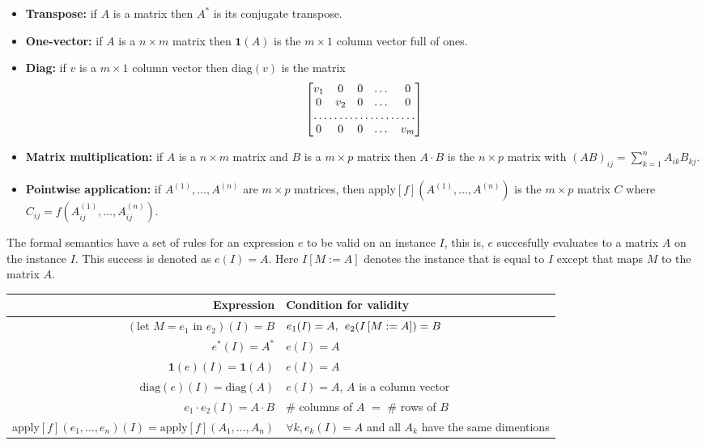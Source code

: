\begin{itemize}
	\item \textbf{Transpose:} if $A$ is a matrix then $A^*$ is its conjugate transpose.
	\item \textbf{One-vector:} if $A$ is a $n\times m$ matrix then $\mathbf{1}(A)$ is the $m\times 1$ column vector full of ones.
	\item \textbf{Diag:} if $v$ is a $m\times 1$ column vector then diag$(v)$ is the matrix
		\[
			\begin{bmatrix}
			    v_{1}       & 0 & 0 & \dots & 0 \\
			    0       & v_{2} & 0 & \dots & 0 \\
			    \hdotsfor{5} \\
			    0       & 0 & 0 & \dots & v_{m}
			\end{bmatrix}
		\]
	\item \textbf{Matrix multiplication:} if $A$ is a $n\times m$ matrix and $B$ is a $m\times p$ matrix then $A\cdot B$ is the $n\times p$ matrix with $(AB)_{ij}=\sum_{k=1}^n A_{ik}B_{kj}$.
	\item \textbf{Pointwise application:} if $A^{(1)}, \ldots, A^{(n)}$ are $m\times p$ matrices, then apply$\left[ f \right](A^{(1)}, \ldots, A^{(n)})$ is the $m\times p$ matrix $C$ where $C_{ij}=f(A^{(1)}_{ij}, \ldots, A^{(n)}_{ij})$.
\end{itemize}
	
	The formal semantics have a set of rules for an expression $e$ to be valid on an instance $I$, this is, $e$ succesfully evaluates to a matrix $A$ on the instance $I$. This success is denoted as $e(I)=A$. Here $I\left[ M:=A\right]$ denotes the instance that is equal to $I$ except that maps $M$ to the matrix $A$.
	
	\begin{center}
    \begin{tabular}{ r | l }
    \hline
    \textbf{Expression} & \textbf{Condition for validity}\\ \hline
    $(\text{let } M=e_1 \text{ in } e_2)(I)=B$ & $e_1(I)=A,\hspace{1ex}e_2(I\left[ M:=A\right])=B$ \\ 
    $e^*(I)=A^*$ & $e(I)=A$ \\
    $\mathbf{1}(e)(I)=\mathbf{1}(A)$ & $e(I)=A$ \\
    $\text{diag}(e)(I)=\text{diag}(A)$ & $e(I)=A$, $A$ is a column vector \\
    $e_1\cdot e_2(I)=A\cdot B$ & \# columns of $A$ $=$ \# rows of $B$ \\
    apply$\left[ f\right](e_1, \ldots, e_n)(I)=\text{apply}\left[ f\right](A_1, \ldots, A_n)$ & $\forall k, e_k(I)=A$ and all $A_k$ have the same dimentions \\
    \end{tabular}
\end{center}

\label{sec:matlang}